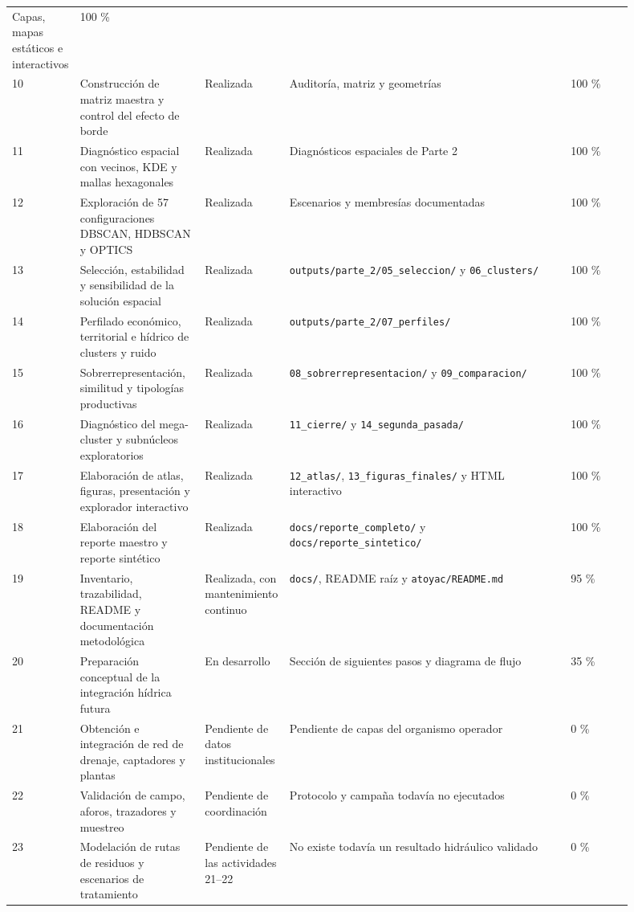 \documentclass[
  spanish,
]{article}
\begin{document}
{\begin{longtable}[]{@{}p{0.04\linewidth}p{0.20\linewidth}p{0.11\linewidth}p{0.45\linewidth}p{0.10\linewidth}@{}}
Capas, mapas estáticos e interactivos &
100 \% \\
10 & Construcción de matriz maestra y control del efecto de borde &
Realizada & Auditoría, matriz y geometrías & 100 \% \\
11 & Diagnóstico espacial con vecinos, KDE y mallas hexagonales &
Realizada & Diagnósticos espaciales de Parte 2 & 100 \% \\
12 & Exploración de 57 configuraciones DBSCAN, HDBSCAN y OPTICS &
Realizada & Escenarios y membresías documentadas & 100 \% \\
13 & Selección, estabilidad y sensibilidad de la solución espacial &
Realizada & \texttt{outputs/parte\_2/05\_seleccion/} y
\texttt{06\_clusters/} & 100 \% \\
14 & Perfilado económico, territorial e hídrico de clusters y ruido &
Realizada & \texttt{outputs/parte\_2/07\_perfiles/} & 100 \% \\
15 & Sobrerrepresentación, similitud y tipologías productivas &
Realizada & \texttt{08\_sobrerrepresentacion/} y
\texttt{09\_comparacion/} & 100 \% \\
16 & Diagnóstico del mega-cluster y subnúcleos exploratorios & Realizada
& \texttt{11\_cierre/} y \texttt{14\_segunda\_pasada/} & 100 \% \\
17 & Elaboración de atlas, figuras, presentación y explorador
interactivo & Realizada & \texttt{12\_atlas/},
\texttt{13\_figuras\_finales/} y HTML interactivo & 100 \% \\
18 & Elaboración del reporte maestro y reporte sintético & Realizada &
\texttt{docs/reporte\_completo/} y \texttt{docs/reporte\_sintetico/} &
100 \% \\
19 & Inventario, trazabilidad, README y documentación metodológica &
Realizada, con mantenimiento continuo & \texttt{docs/}, README raíz y
\texttt{atoyac/README.md} & 95 \% \\
20 & Preparación conceptual de la integración hídrica futura & En
desarrollo & Sección de siguientes pasos y diagrama de flujo & 35 \% \\
21 & Obtención e integración de red de drenaje, captadores y plantas &
Pendiente de datos institucionales & Pendiente de capas del organismo
operador & 0 \% \\
22 & Validación de campo, aforos, trazadores y muestreo & Pendiente de
coordinación & Protocolo y campaña todavía no ejecutados & 0 \% \\
23 & Modelación de rutas de residuos y escenarios de tratamiento &
Pendiente de las actividades 21--22 & No existe todavía un resultado
hidráulico validado & 0 \% \\
\end{longtable}
}
\end{document}
